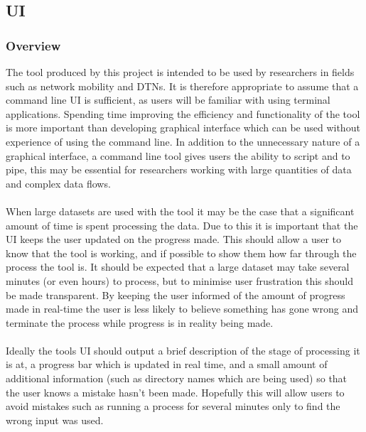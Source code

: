 \subsection{UI} %
\subsubsection{Overview}
The tool produced by this project is intended to be used by researchers in fields such as network mobility and DTNs. It is therefore appropriate to assume that a command line UI is sufficient, as users will be familiar with using terminal applications. Spending time improving the efficiency and functionality of the tool is more important than developing graphical interface which can be used without experience of using the command line. In addition to the unnecessary nature of a graphical interface, a command line tool gives users the ability to script and to pipe, this may be essential for researchers working with large quantities of data and complex data flows.\\\\
When large datasets are used with the tool it may be the case that a significant amount of time is spent processing the data. Due to this it is important that the UI keeps the user updated on the progress made. This should allow a user to know that the tool is working, and if possible to show them how far through the process the tool is. It should be expected that a large dataset may take several minutes (or even hours) to process, but to minimise user frustration this should be made transparent. By keeping the user informed of the amount of progress made in real-time the user is less likely to believe something has gone wrong and terminate the process while progress is in reality being made.\\\\
Ideally the tools UI should output a brief description of the stage of processing it is at, a progress bar which is updated in real time, and a small amount of additional information (such as directory names which are being used) so that the user knows a mistake hasn't been made. Hopefully this will allow users to avoid mistakes such as running a process for several minutes only to find the wrong input was used.\\\\

